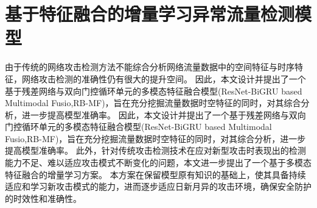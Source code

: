 \chapter{基于特征融合的增量学习异常流量检测模型}
\label{cha:ResNet-BiGRU}

由于传统的网络攻击检测方法不能综合分析网络流量数据中的空间特征与时序特征，网络攻击检测的准确性仍有很大的提升空间。
因此，本文设计并提出了一个基于残差网络与双向门控循环单元的多模态特征融合模型(ResNet-BiGRU based Multimodal Fusio,RB-MF)，旨在充分挖掘流量数据时空特征的同时，对其综合分析，进一步提高模型准确率。
因此，本文设计并提出了一个基于残差网络与双向门控循环单元的多模态特征融合模型(ResNet-BiGRU based Multimodal Fusio,RB-MF)，旨在充分挖掘流量数据时空特征的同时，对其综合分析，进一步提高模型准确率。
此外，针对传统攻击检测技术在应对新型攻击时表现出的检测能力不足、难以适应攻击模式不断变化的问题，本文进一步提出了一个基于多模态特征融合的增量学习方案。
本方案在保留模型原有知识的基础上，使其具备持续适应和学习新攻击模式的能力，进而逐步适应日新月异的攻击环境，确保安全防护的时效性和准确性。

